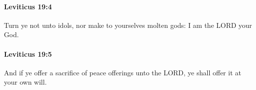 		\paragraph{Leviticus 19:4} %
			\label{LEVITICUS-19-4}

			Turn ye not unto idols, nor make to yourselves molten gods: I am the LORD your God.


		\paragraph{Leviticus 19:5} %
			\label{LEVITICUS-19-5}

			And if ye offer a sacrifice of peace offerings unto the LORD, ye shall offer it at your own will.



